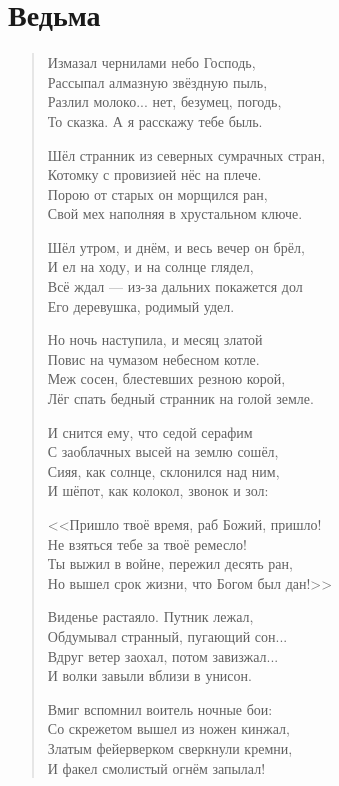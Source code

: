 \section{Ведьма}

\begin{verse}
Измазал чернилами небо Господь,\\
Рассыпал алмазную звёздную пыль,\\
Разлил молоко... нет, безумец, погодь,\\
То сказка. А я расскажу тебе быль.

Шёл странник из северных сумрачных стран,\\
Котомку с провизией нёс на плече.\\
Порою от старых он морщился ран,\\
Свой мех наполняя в хрустальном ключе.

Шёл утром, и днём, и весь вечер он брёл,\\
И ел на ходу, и на солнце глядел,\\
Всё ждал --- из-за дальних покажется дол\\
Его деревушка, родимый удел.

Но ночь наступила, и месяц златой\\
Повис на чумазом небесном котле.\\
Меж сосен, блестевших резною корой,\\
Лёг спать бедный странник на голой земле.

И снится ему, что седой серафим\\
С заоблачных высей на землю сошёл,\\
Сияя, как солнце, склонился над ним,\\
И шёпот, как колокол, звонок и зол:

<<Пришло твоё время, раб Божий, пришло!\\
Не взяться тебе за твоё ремесло!\\
Ты выжил в войне, пережил десять ран,\\
Но вышел срок жизни, что Богом был дан!>>

Виденье растаяло. Путник лежал,\\
Обдумывал странный, пугающий сон...\\
Вдруг ветер заохал, потом завизжал...\\
И волки завыли вблизи в унисон.

Вмиг вспомнил воитель ночные бои:\\
Со скрежетом вышел из ножен кинжал,\\
Златым фейерверком сверкнули кремни,\\
И факел смолистый огнём запылал!


\end{verse}
